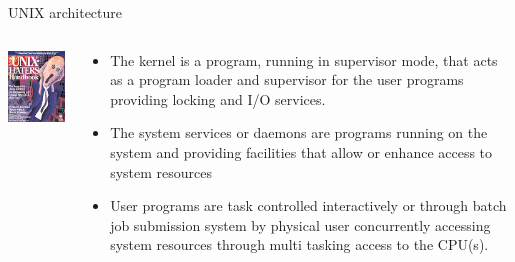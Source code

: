\documentclass[unknownkeysallowed, 10pt, a4 paper, handout]{beamer}
\begin{document}
\begin{frame}[label=architecture]{UNIX architecture}
  \begin{columns}[T]
    \begin{column}{.23\textwidth}
      \includegraphics[scale=0.5]{pics/UNIX-HATERS_Handbook_cover_ISBN_1-56884-203-1.png}
    \end{column}
    \begin{column}{.73\textwidth}
      \begin{itemize}
      \item The kernel is a program, running in supervisor mode, that acts as a
        program loader and supervisor for the user programs providing locking
        and I/O services.
      \item The system services or daemons are programs running on the system
        and providing facilities that allow or enhance access to system
        resources
      \item User programs are task controlled interactively or through batch job
        submission system by physical user concurrently accessing system
        resources through multi tasking access to the CPU(s).
    \end{itemize}
    \end{column}
  \end{columns}
\end{frame}

\end{document}
